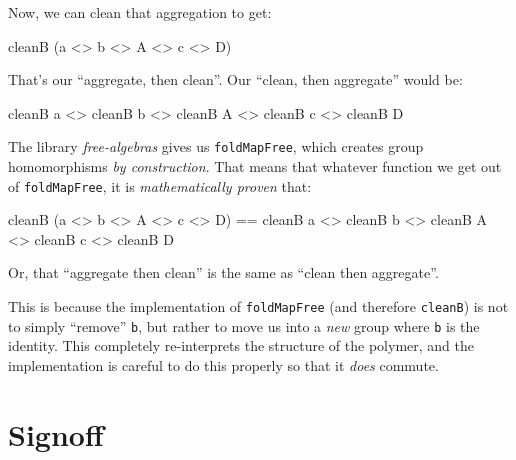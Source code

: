 \documentclass[]{article}
\newenvironment{Shaded}{}{}
\newcommand{\DataTypeTok}[1]{\textcolor[rgb]{0.56,0.13,0.00}{#1}}
\newcommand{\NormalTok}[1]{#1}
\newcommand{\OperatorTok}[1]{\textcolor[rgb]{0.40,0.40,0.40}{#1}}
\begin{document}
Now, we can clean that aggregation to get:

\begin{Shaded}
\begin{Highlighting}[]
\NormalTok{cleanB (a }\OperatorTok{<>}\NormalTok{ b }\OperatorTok{<>} \DataTypeTok{A} \OperatorTok{<>}\NormalTok{ c }\OperatorTok{<>} \DataTypeTok{D}\NormalTok{)}
\end{Highlighting}
\end{Shaded}

That's our ``aggregate, then clean''. Our ``clean, then aggregate'' would be:

\begin{Shaded}
\begin{Highlighting}[]
\NormalTok{cleanB a }\OperatorTok{<>}\NormalTok{ cleanB b }\OperatorTok{<>}\NormalTok{ cleanB }\DataTypeTok{A} \OperatorTok{<>}\NormalTok{ cleanB c }\OperatorTok{<>}\NormalTok{ cleanB }\DataTypeTok{D}
\end{Highlighting}
\end{Shaded}

The library \emph{free-algebras} gives us \texttt{foldMapFree}, which creates
group homomorphisms \emph{by construction}. That means that whatever function we
get out of \texttt{foldMapFree}, it is \emph{mathematically proven} that:

\begin{Shaded}
\begin{Highlighting}[]
\NormalTok{cleanB (a }\OperatorTok{<>}\NormalTok{ b }\OperatorTok{<>} \DataTypeTok{A} \OperatorTok{<>}\NormalTok{ c }\OperatorTok{<>} \DataTypeTok{D}\NormalTok{)}
 \OperatorTok{==}\NormalTok{ cleanB a }\OperatorTok{<>}\NormalTok{ cleanB b }\OperatorTok{<>}\NormalTok{ cleanB }\DataTypeTok{A} \OperatorTok{<>}\NormalTok{ cleanB c }\OperatorTok{<>}\NormalTok{ cleanB }\DataTypeTok{D}
\end{Highlighting}
\end{Shaded}

Or, that ``aggregate then clean'' is the same as ``clean then aggregate''.

This is because the implementation of \texttt{foldMapFree} (and therefore
\texttt{cleanB}) is not to simply ``remove'' \texttt{b}, but rather to move us
into a \emph{new} group where \texttt{b} is the identity. This completely
re-interprets the structure of the polymer, and the implementation is careful to
do this properly so that it \emph{does} commute.

\hypertarget{signoff}{%
\section{Signoff}\label{signoff}}
\end{document}

